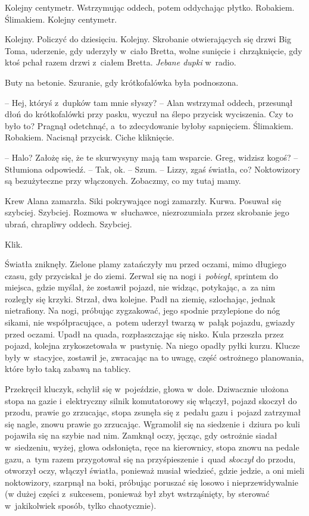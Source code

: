 \documentclass[oneside,polish,11pt,sfheadings]{mwbk}
\begin{document}
Kolejny centymetr. Wstrzymując oddech, potem oddychając płytko.
Robakiem. Ślimakiem. Kolejny centymetr.

Kolejny. Policzyć do dziesięciu. Kolejny. Skrobanie otwierających się
drzwi Big Toma, uderzenie, gdy uderzyły w~ciało Bretta, wolne sunięcie i~chrząknięcie, gdy ktoś pchał razem drzwi z~ciałem Bretta. \textit{Jebane
dupki} w~radio.

Buty na betonie. Szuranie, gdy krótkofalówka była podnoszona. 

-- Hej, któryś z~dupków tam mnie słyszy? -- Alan wstrzymał oddech, przesunął dłoń
do krótkofalówki przy pasku, wyczuł na ślepo przycisk wyciszenia. Czy to
było to? Pragnął odetchnąć, a~to zdecydowanie byłoby sapnięciem.
Ślimakiem. Robakiem. Nacisnął przycisk. Ciche kliknięcie.

-- Halo? Założę się, że te skurwysyny mają tam wsparcie. Greg, widzisz
kogoś? -- Stłumiona odpowiedź. -- Tak, ok. -- Szum. -- Lizzy, zgaś światła,
co? Noktowizory są bezużyteczne przy włączonych. Zobaczmy, co my tutaj
mamy.

Krew Alana zamarzła. Siki pokrywające nogi zamarzły. Kurwa. Posuwał się
szybciej. Szybciej. Rozmowa w~słuchawce, niezrozumiała przez skrobanie
jego ubrań, chrapliwy oddech. Szybciej.

Klik.

Światła zniknęły. Zielone plamy zatańczyły mu przed oczami, mimo
długiego czasu, gdy przyciskał je do ziemi. Zerwał się na nogi i~\textit{pobiegł}, sprintem do miejsca, gdzie myślał, że zostawił pojazd,
nie widząc, potykając, a~za nim rozległy się krzyki. Strzał, dwa
kolejne. Padł na ziemię, szlochając, jednak nietrafiony. Na nogi,
próbując zygzakować, jego spodnie przylepione do nóg sikami, nie
współpracujące, a~potem uderzył twarzą w~pałąk pojazdu, gwiazdy przed
oczami. Upadł na quada, rozpłaszczając się nisko. Kula przeszła przez
pojazd, kolejna zrykoszetowała w~pustynię. Na niego opadły pyłki kurzu.
Klucze były w~stacyjce, zostawił je, zwracając na to uwagę, część
ostrożnego planowania, które było taką zabawą na tablicy.

Przekręcił kluczyk, schylił się w~pojeździe, głowa w~dole. Dziwacznie
ułożona stopa na gazie i~elektryczny silnik komutatorowy się włączył,
pojazd skoczył do przodu, prawie go zrzucając, stopa zsunęła się z~pedału gazu i~pojazd zatrzymał się nagle, znowu prawie go zrzucając.
Wgramolił się na siedzenie i~dziura po kuli pojawiła się na szybie nad
nim. Zamknął oczy, jęcząc, gdy ostrożnie siadał w~siedzeniu, wyżej,
głowa odsłonięta, ręce na kierownicy, stopa znowu na pedale gazu, a~tym
razem przygotował się na przyśpieszenie i~quad \textit{skoczył} do przodu,
otworzył oczy, włączył światła, ponieważ musiał wiedzieć, gdzie jedzie,
a oni mieli noktowizory, szarpnął na boki, próbując poruszać się losowo
i nieprzewidywalnie (w dużej części z~sukcesem, ponieważ był zbyt
wstrząśnięty, by sterować w~jakikolwiek sposób, tylko chaotycznie).
\end{document}
